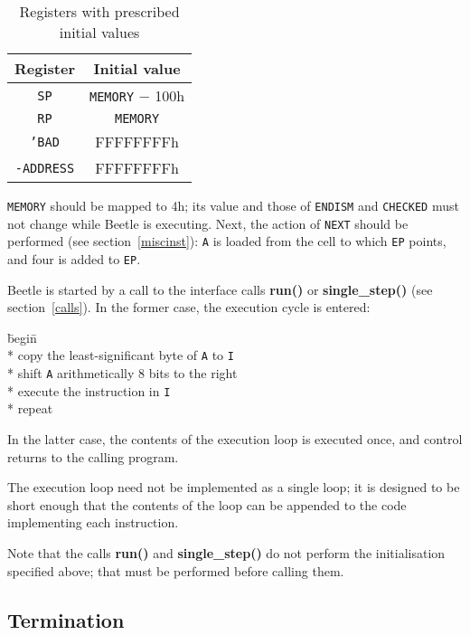 \documentclass[english]{article}
\begin{document}
\begin{table}[htbp]
\begin{center}
\begin{tabular}{cc} \toprule
\bf Register & \bf Initial value \\ \midrule
{\tt SP} & {\tt MEMORY} $-$ 100h \\
{\tt RP} & {\tt MEMORY} \\
{\tt 'BAD} & {FFFFFFFFh} \\
{\tt -ADDRESS} & {FFFFFFFFh} \\ \bottomrule
\end{tabular}
\caption{\label{inittable}Registers with prescribed initial values}
\end{center}
\end{table}

{\tt MEMORY} should be mapped to 4h; its value and those of {\tt ENDISM} and
{\tt CHECKED} must not change while Beetle is executing. Next, the action of
{\tt NEXT} should be performed (see section~\ref{miscinst}): {\tt A} is loaded
from the cell to which {\tt EP} points, and four is added to {\tt EP}.

Beetle is started by a call to the interface calls {\bf run()} or {\bf
single\_step()} (see section~\ref{calls}). In the former case, the execution
cycle is entered:

\begin{tabbing}
\hspace{0.5in}\=begin\=\+\+ \\*
copy the least-significant byte of {\tt A} to {\tt I} \\*
shift {\tt A} arithmetically 8 bits to the right \\*
execute the instruction in {\tt I} \- \\*
repeat
\end{tabbing}

In the latter case, the contents of the execution loop is executed once, and
control returns to the calling program.

The execution loop need not be implemented as a single loop; it  is designed to
be short enough that the contents of the loop can be appended  to the code
implementing each instruction.

Note that the calls {\bf run()} and {\bf single\_step()} do not perform the
initialisation specified above; that must be performed before calling them.


\subsection{Termination}
\end{document}
